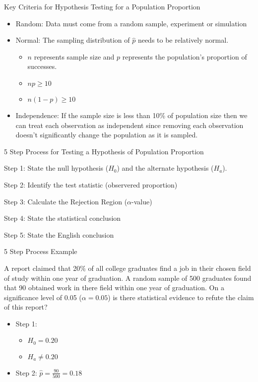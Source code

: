 \begin{frame}{Key Criteria for Hypothesis Testing for a Population
Proportion}

\begin{itemize}
\tightlist
\item
  Random: Data must come from a random sample, experiment or simulation
\item
  Normal: The sampling distribution of \(\hat{p}\) needs to be
  relatively normal.

  \begin{itemize}
  \tightlist
  \item
    \(n\) represents sample size and \(p\) represents the population's
    proportion of successes.
  \item
    \(np \geq 10\)
  \item
    \(n(1-p) \geq 10\)
  \end{itemize}
\item
  Independence: If the sample size is less than 10\% of population size
  then we can treat each observation as independent since removing each
  observation doesn't significantly change the population as it is
  sampled.
\end{itemize}

\end{frame}

\begin{frame}{5 Step Process for Testing a Hypothesis of Population
Proportion}

Step 1: State the null hypothesis (\(H_0\)) and the alternate hypothesis
(\(H_a\)).

Step 2: Identify the test statistic (observered proportion)

Step 3: Calculate the Rejection Region (\(\alpha\)-value)

Step 4: State the statistical conclusion

Step 5: State the English conclusion

\end{frame}

\begin{frame}{5 Step Process Example}

A report claimed that 20\% of all college graduates find a job in their
chosen field of study within one year of graduation. A random sample of
500 graduates found that 90 obtained work in there field within one year
of graduation. On a significance level of 0.05 (\(\alpha = 0.05\)) is
there statistical evidence to refute the claim of this report?

\begin{itemize}
\tightlist
\item
  Step 1:

  \begin{itemize}
  \tightlist
  \item
    \(H_0 = 0.20\)
  \item
    \(H_a \neq 0.20\)
  \end{itemize}
\item
  Step 2: \(\hat{p} = \frac{90}{500} = 0.18\)
\end{itemize}

\end{frame}

